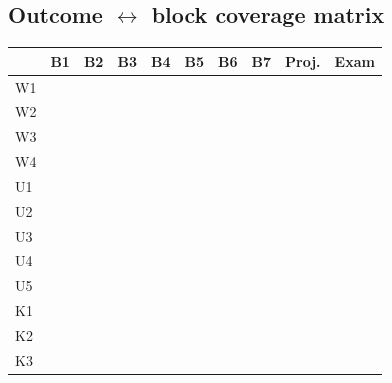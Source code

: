 \documentclass[11pt,a4paper]{article}
\newcommand{\yes}{\checkmark}
\begin{document}
\subsection{Outcome $\leftrightarrow$ block coverage matrix}
\begin{center}\small
\begin{tabular}{@{}lccccccc|cc@{}}
\toprule
 & B1 & B2 & B3 & B4 & B5 & B6 & B7 & Proj. & Exam \\
\midrule
W1 & \yes & \yes &      &      & \yes &      &      & \yes & \yes \\
W2 &      & \yes & \yes & \yes & \yes & \yes &      & \yes & \yes \\
W3 &      & \yes & \yes & \yes & \yes & \yes & \yes & \yes & \yes \\
W4 & \yes & \yes & \yes & \yes & \yes & \yes &      & \yes & \yes \\
U1 & \yes & \yes & \yes & \yes & \yes & \yes &      & \yes &      \\
U2 & \yes & \yes & \yes & \yes & \yes &      &      & \yes &      \\
U3 &      & \yes & \yes & \yes & \yes & \yes &      & \yes &      \\
U4 &      & \yes & \yes & \yes &      & \yes &      & \yes & \yes \\
U5 &      & \yes & \yes & \yes & \yes & \yes &      & \yes & \yes \\
K1 & \yes &      &      &      &      &      & \yes & \yes &      \\
K2 &      &      & \yes & \yes & \yes & \yes & \yes & \yes &      \\
K3 & \yes &      & \yes &      &      & \yes &      & \yes & \yes \\
\bottomrule
\end{tabular}
\end{center}
\end{document}
